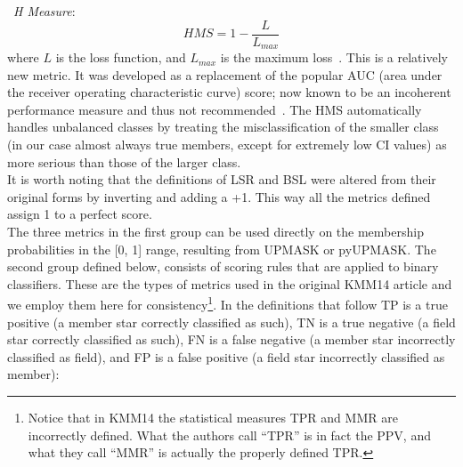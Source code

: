 \documentclass{aa}
\begin{document}
 \noindent \textbullet\ \emph{H Measure}:
 \begin{equation}
 HMS = 1 - \frac{L}{L_{max}}
 \end{equation}
 \noindent where $L$ is the loss function, and $L_{max}$ is the maximum
 loss~\cite[the expression for the loss function is much too mathematically
 involved to be presented here, it can be seen in full in][]{Hand_2009}.
 This is a relatively new metric. It was developed as a replacement of the
 popular AUC (area under the receiver operating characteristic curve) score;
 now known to be an incoherent performance measure and thus not
 recommended~\citep{Lobo_2008,Parker_2011,Hand_2014}. The HMS automatically
 handles unbalanced classes by treating the misclassification of the smaller
 class (in our case almost always true members, except for extremely low CI
 values) as more serious than those of the larger class.\\

 \noindent It is worth noting that the definitions of LSR and BSL were altered
 from their original forms by inverting and adding a +1. This way all the
 metrics defined assign 1 to a perfect score.\\

 The three metrics in the first group can be used directly on the membership
 probabilities in the [0, 1] range, resulting from UPMASK or pyUPMASK.
 The second group defined below, consists of scoring rules that are applied
 to binary classifiers. These are the types of metrics used in the original
 KMM14 article and we employ them here for consistency\footnote{Notice that in
 KMM14 the statistical measures TPR and MMR are incorrectly defined. What the
 authors call ``TPR'' is in fact the PPV, and what they call ``MMR''
 is actually the properly defined TPR.}.
 In the definitions that follow TP is a true positive (a member star correctly
 classified as such), TN is a true negative (a field star correctly classified
 as such), FN is a false negative (a member star incorrectly
 classified as field), and FP is a false positive (a field star incorrectly
 classified as member):\\
\end{document}
